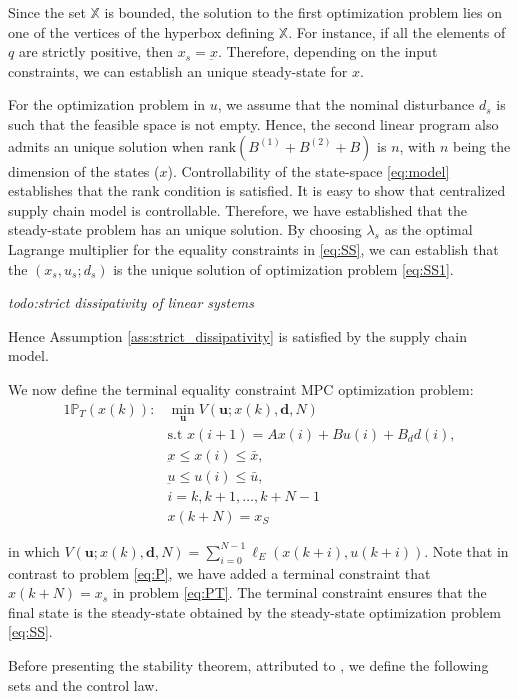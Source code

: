 \documentclass[10pt]{article}
\newcommand{\bu}{\mathbf{u}}
\newcommand{\bd}{\mathbf{d}}
\theoremstyle{definition}
\begin{document}
Since the set $\mathbb{X}$ is bounded, the solution to the first
optimization problem lies on one of the vertices of the hyperbox
defining $\mathbb{X}$. For instance, if all the elements of $q$ are
strictly positive, then $x_s = \underbar{x}$. Therefore, depending on
the input constraints, we can establish an unique steady-state for
$x$.

For the optimization
problem in $u$, we assume that the nominal disturbance $d_s$ is such
that the feasible space is not empty. Hence, the second linear program
also admits an unique solution when $\text{rank}(B^{(1)}+B^{(2)}+B)$ is $n$, with
$n$ being the dimension of the states ($x$). Controllability of the
state-space \eqref{eq:model} establishes that the rank condition is
satisfied. It is easy to show that centralized supply chain model is
controllable. Therefore, we have established that the
steady-state problem has an unique solution. By choosing $\lambda_s$
as the optimal Lagrange multiplier for the equality constraints in
\eqref{eq:SS}, we can establish that the $(x_s,u_s;d_s)$ is the unique
solution of optimization problem \eqref{eq:SS1}. 

{\em{todo:strict dissipativity of linear systems}}

Hence Assumption \ref{ass:strict_dissipativity} is satisfied by the
supply chain model.

We now define the terminal equality constraint MPC optimization
problem:
\begin{alignat}{1}
\label{eq:PT}
\mathbb{P}_T(x(k)):& \min_{\bu}{V(\bu;x(k),\bd,N)} \nonumber \\
&\text{s.t~} x(i+1) = Ax(i) + Bu(i)+B_dd(i), \nonumber\\
&\underbar{x} \leq x(i) \leq \bar{x},  \\
&\underbar{u} \leq u(i) \leq \bar{u}, \nonumber \\
&i = k,k+1,\ldots,k+N-1\nonumber\\
&x(k+N) = x_S \nonumber
\end{alignat}

in which $V(\bu;x(k),\bd,N) = \sum_{i=0}^{N-1}
\ell_E(x(k+i),u(k+i))$. Note that in contrast to problem \eqref{eq:P},
we have added a terminal constraint that $x(k+N) = x_s$ in problem
\eqref{eq:PT}. The terminal constraint ensures that the final state is
the steady-state obtained by the steady-state optimization problem
\eqref{eq:SS}.

Before presenting the stability theorem, attributed to
\citet{diehl:amrit:rawlings:2011}, we define the following sets and
the control law.
\end{document}

